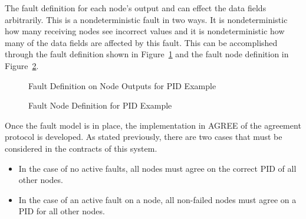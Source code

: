The fault definition for %
each node's output and can effect the data fields arbitrarily. This is a nondeterministic fault in two ways. It is nondeterministic how many receiving nodes see incorrect values and it is nondeterministic how many of the data fields are affected by this fault. This can be accomplished through the fault definition shown in Figure~\ref{fig:PIDFaultNode} and the fault node definition in Figure~\ref{fig:PIDFaultDef}. 

\begin{figure}[!htb]
        \caption{\label{fig:PIDFaultNode} Fault Definition on Node Outputs for PID Example}
\end{figure}

\begin{figure}[!htb]
        \caption{\label{fig:PIDFaultDef} Fault Node Definition for PID Example}
\end{figure}

Once the fault model is in place, the implementation in AGREE of the agreement protocol is developed. As stated previously, there are two cases that must be considered in the contracts of this system. 
\begin{itemize}
	\item In the case of no active faults, all nodes must agree on the correct PID of all other nodes. 
	\item In the case of an active fault on a node, all non-failed nodes must agree on a PID for all other nodes. 
\end{itemize}

